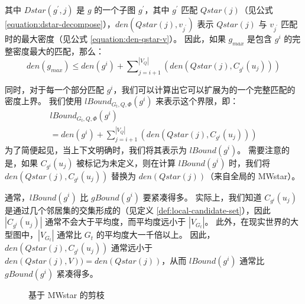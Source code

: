 其中 $Dstar(g^\prime, j)$ 是 $g$ 的一个子图 $g^\prime$，其中 $g^\prime$ 匹配 $Qstar(j)$（见公式 \ref{equation:dstar-decompose}），$den(Qstar(j), v_{j^\prime})$ 表示 $Qstar(j)$ 与 $v_{j^\prime}$ 匹配时的最大密度（见公式 \ref{equation:den-qstar-v}）。
因此，如果 $g_{max}$ 是包含 $g^i$ 的完整密度最大的匹配，那么：
\[
	den(g_{max}) \leq den(g^i) + \sum\nolimits_{j=i+1}^{|V_Q|} \left(den(Qstar(j), C_{g^i}(u_j))\right)
\]

同时，对于每一个部分匹配 $g^i$，我们可以计算出它可以扩展为的一个完整匹配的密度上界。
我们使用 $lBound_{G_t, Q, \Phi}(g^i)$ 来表示这个界限，即：
\begin{equation*}
    \begin{multlined}
    lBound_{G_t, Q, \Phi}(g^i) \\ = den(g^i) + \sum\nolimits_{j=i+1}^{|V_Q|} \left(den(Qstar(j), C_{g^i}(u_j))\right)
    \end{multlined}
    \end{equation*}
为了简便起见，当上下文明确时，我们将其表示为 $lBound(g^i)$。
需要注意的是，如果 $C_{g^i}(u_j)$ 被标记为未定义，则在计算 $lBound(g^i)$ 时，我们将 $den(Qstar(j), C_{g^i}(u_j))$ 替换为 $den(Qstar(j))$（来自全局的 MWstar）。

通常，$lBound(g^i)$ 比 $gBound(g^i)$ 要紧凑得多。
实际上，我们知道 $C_{g^i}(u_j)$ 是通过几个邻居集的交集形成的（见定义 \ref{def:local-candidate-set}），因此 $|C_{g^i}(u_j)|$ 通常不会大于平均度，而平均度远小于 $|V_{G_t}|$。
此外，在现实世界的大型图中，$|V_{G_t}|$ 通常比 $G_t$ 的平均度大一千倍以上。
因此，$den(Qstar(j), C_{g^i}(u_j))$ 通常远小于 $den(Qstar(j), V)) = den(Qstar(j))$，从而 $lBound(g^i)$ 通常比 $gBound(g^i)$ 紧凑得多。

\begin{figure}[h!]
\centering
{}
\caption{基于 MWstar 的剪枝}
\label{fig:exp:mwstar:pruning}
\end{figure}

